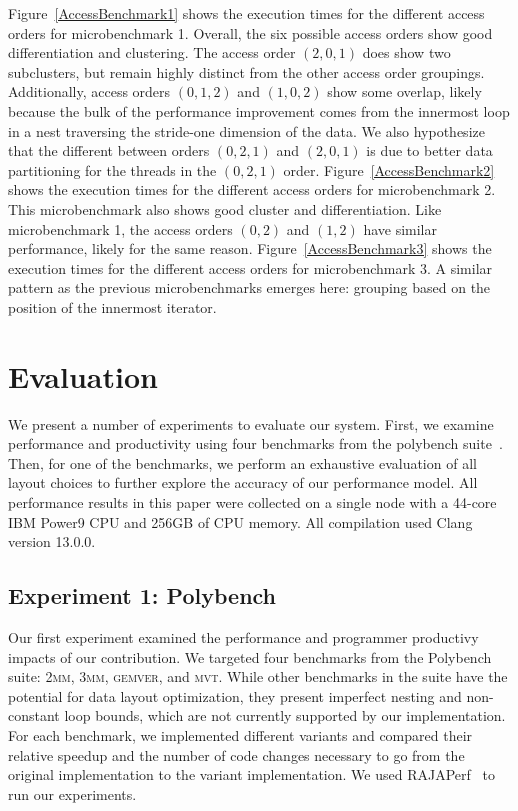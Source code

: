 \documentclass[sigconf]{acmart}
\begin{document}
Figure~\ref{AccessBenchmark1} shows the execution times for the different access orders for microbenchmark 1.
Overall, the six possible access orders show good differentiation and clustering.
The access order $(2,0,1)$ does show two subclusters, but remain highly distinct from the other access order groupings. 
Additionally, access orders $(0,1,2)$ and $(1,0,2)$ show some overlap, likely because the bulk of the performance improvement comes from the innermost loop in a nest traversing the stride-one dimension of the data.
We also hypothesize that the different between orders $(0,2,1)$ and $(2,0,1)$ is due to better data partitioning for the threads in the $(0,2,1)$ order. 
Figure~\ref{AccessBenchmark2} shows the execution times for the different access orders for microbenchmark 2. 
This microbenchmark also shows good cluster and differentiation.
Like microbenchmark 1, the access orders $(0,2)$ and $(1,2)$ have similar performance, likely for the same reason. 
Figure~\ref{AccessBenchmark3} shows the execution times for the different access orders for microbenchmark 3.
A similar pattern as the previous microbenchmarks emerges here: grouping based on the position of the innermost iterator. 


\section{Evaluation}

We present a number of experiments to evaluate our system. 
First, we examine performance and productivity using four benchmarks from the polybench suite~\cite{pouchet2012polybench}.
Then, for one of the benchmarks, we perform an exhaustive evaluation of all layout choices to further explore the accuracy of our performance model.
All performance results in this paper were collected on a single node with a 44-core IBM Power9 CPU and 256GB of CPU memory.
All compilation used Clang version 13.0.0.

\subsection{Experiment 1: Polybench}

Our first experiment examined the performance and programmer productivy impacts of our contribution.
We targeted four benchmarks from the Polybench suite: \textsc{2mm}, \textsc{3mm}, \textsc{gemver}, and \textsc{mvt}.
While other benchmarks in the suite have the potential for data layout optimization, they present imperfect nesting and non-constant loop bounds, which are not currently supported by our implementation. 
For each benchmark, we implemented different variants and compared their relative speedup and the number of code changes necessary to go from the original implementation to the variant implementation.
We used RAJAPerf~\cite{hornung2017raja} to run our experiments.
\end{document}
